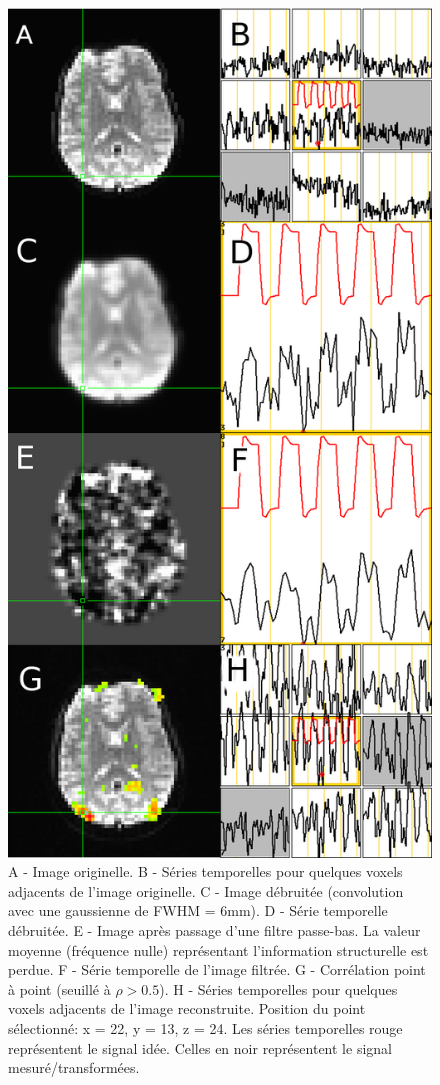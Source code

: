 \documentclass[a4paper]{article}
\begin{document}
\begin{figure}[h]
   \centering
   \includegraphics[height=0.85\textheight]{fmri_reconstruction}
   \caption{\label{fmri_reconstruction} A - Image originelle. B - Séries temporelles pour quelques voxels adjacents de l'image originelle. C - Image débruitée (convolution avec une gaussienne de FWHM = 6mm). D - Série temporelle débruitée. E - Image après passage d'une filtre passe-bas. La valeur moyenne (fréquence nulle) représentant l'information structurelle est perdue. F - Série temporelle de l'image filtrée. G - Corrélation point à point (seuillé à $\rho > 0.5$). H - Séries temporelles pour quelques voxels adjacents de l'image reconstruite. Position du point sélectionné: x = 22, y = 13, z = 24. Les séries temporelles rouge représentent le signal idée. Celles en noir représentent le signal mesuré/transformées.}
\end{figure}
\end{document}
